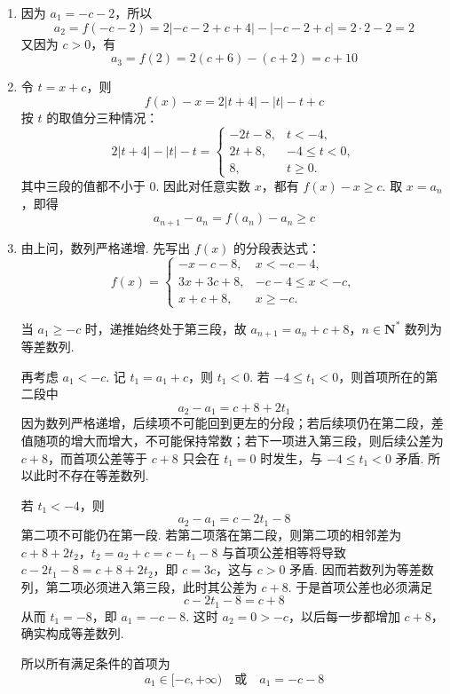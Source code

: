 \begin{solution}
\begin{enumerate}
\item 因为 \(a_1=-c-2\)，所以
\[
a_2=f(-c-2)=2\left|-c-2+c+4\right|-\left|-c-2+c\right|=2\cdot2-2=2
\]
又因为 \(c>0\)，有
\[
a_3=f(2)=2(c+6)-(c+2)=c+10
\]

\item 令 \(t=x+c\)，则
\[
f(x)-x=2|t+4|-|t|-t+c
\]
按 \(t\) 的取值分三种情况：
\[
2|t+4|-|t|-t=
\begin{cases}
-2t-8, & t<-4,\\
2t+8, & -4\leqslant t<0,\\
8, & t\geqslant0.
\end{cases}
\]
其中三段的值都不小于 \(0\). 因此对任意实数 \(x\)，都有 \(f(x)-x\geqslant c\). 取 \(x=a_n\)，即得
\[
a_{n+1}-a_n=f(a_n)-a_n\geqslant c
\]

\item 由上问，数列严格递增. 先写出 \(f(x)\) 的分段表达式：
\[
f(x)=
\begin{cases}
-x-c-8, & x<-c-4,\\
3x+3c+8, & -c-4\leqslant x<-c,\\
x+c+8, & x\geqslant-c.
\end{cases}
\]

当 \(a_1\geqslant-c\) 时，递推始终处于第三段，故
\(a_{n+1}=a_n+c+8\)，\(n\in\mathbf{N}^*\)
数列为等差数列.

再考虑 \(a_1<-c\). 记 \(t_1=a_1+c\)，则 \(t_1<0\). 若 \(-4\leqslant t_1<0\)，则首项所在的第二段中
\[
a_2-a_1=c+8+2t_1
\]
因为数列严格递增，后续项不可能回到更左的分段；若后续项仍在第二段，差值随项的增大而增大，不可能保持常数；若下一项进入第三段，则后续公差为 \(c+8\)，而首项公差等于 \(c+8\) 只会在 \(t_1=0\) 时发生，与 \(-4\leqslant t_1<0\) 矛盾. 所以此时不存在等差数列.

若 \(t_1<-4\)，则
\[
a_2-a_1=c-2t_1-8
\]
第二项不可能仍在第一段. 若第二项落在第二段，则第二项的相邻差为
\(c+8+2t_2\)，\(t_2=a_2+c=c-t_1-8\)
与首项公差相等将导致 \(c-2t_1-8=c+8+2t_2\)，即 \(c=3c\)，这与 \(c>0\) 矛盾. 因而若数列为等差数列，第二项必须进入第三段，此时其公差为 \(c+8\). 于是首项公差也必须满足
\[
c-2t_1-8=c+8
\]
从而 \(t_1=-8\)，即 \(a_1=-c-8\). 这时 \(a_2=0>-c\)，以后每一步都增加 \(c+8\)，确实构成等差数列.

所以所有满足条件的首项为
\[
a_1\in[-c,+\infty)\quad\text{或}\quad a_1=-c-8
\]
\end{enumerate}
\end{solution}
